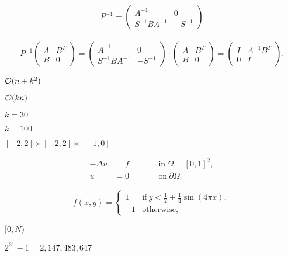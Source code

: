 \documentclass{article}
\begin{document}
\begin{eqnarray*} P^{-1} = \left(\begin{array}{cc} A^{-1} & 0 \\ S^{-1} B A^{-1} & -S^{-1} \end{array}\right) \end{eqnarray*}
\pagebreak

\begin{eqnarray*} P^{-1}\left(\begin{array}{cc} A & B^T \\ B & 0 \end{array}\right) = \left(\begin{array}{cc} A^{-1} & 0 \\ S^{-1} B A^{-1} & -S^{-1} \end{array}\right)\cdot \left(\begin{array}{cc} A & B^T \\ B & 0 \end{array}\right) = \left(\begin{array}{cc} I & A^{-1} B^T \\ 0 & I \end{array}\right). \end{eqnarray*}
\pagebreak

${\cal O}(n + k^2)$
\pagebreak

${\cal O}(kn)$
\pagebreak

$k=30$
\pagebreak

$k=100$
\pagebreak

$[-2,2]\times[-2,2]\times[-1,0]$
\pagebreak

\begin{align*} -\Delta u &= f \qquad &&\text{in}\ \Omega=[0,1]^2, \\ u &= 0 \qquad &&\text{on}\ \partial\Omega. \end{align*}
\pagebreak

\begin{align*} f(x,y) = \left\{ \begin{array}{ll} 1 & \text{if}\ y < \frac 12 + \frac 14 \sin(4\pi x), \\ -1 & \text{otherwise}, \end{array} \right. \end{align*}
\pagebreak

$[0,N)$
\pagebreak

$2^31-1=2,147,483,647$
\pagebreak
\end{document}
